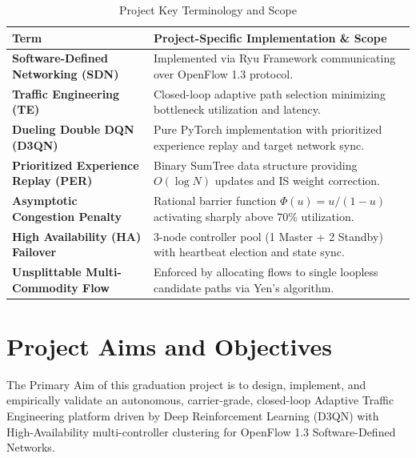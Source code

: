 \documentclass[12pt,a4paper,oneside]{report}
\begin{document}
\begin{table}[htbp]
\centering
\caption{Project Key Terminology and Scope}
\label{tab:terminology}
\small
\begin{tabularx}{\textwidth}{l X}
\toprule
\textbf{Term} & \textbf{Project-Specific Implementation \& Scope} \\
\midrule
\textbf{Software-Defined Networking (SDN)} & Implemented via Ryu Framework communicating over OpenFlow 1.3 protocol. \\
\textbf{Traffic Engineering (TE)} & Closed-loop adaptive path selection minimizing bottleneck utilization and latency. \\
\textbf{Dueling Double DQN (D3QN)} & Pure PyTorch implementation with prioritized experience replay and target network sync. \\
\textbf{Prioritized Experience Replay (PER)} & Binary SumTree data structure providing $O(\log N)$ updates and IS weight correction. \\
\textbf{Asymptotic Congestion Penalty} & Rational barrier function $\Phi(u) = u / (1 - u)$ activating sharply above 70\% utilization. \\
\textbf{High Availability (HA) Failover} & 3-node controller pool (1 Master + 2 Standby) with heartbeat election and state sync. \\
\textbf{Unsplittable Multi-Commodity Flow} & Enforced by allocating flows to single loopless candidate paths via Yen's algorithm. \\
\bottomrule
\end{tabularx}
\end{table}

\section{Project Aims and Objectives}
The Primary Aim of this graduation project is to design, implement, and empirically validate an autonomous, carrier-grade, closed-loop Adaptive Traffic Engineering platform driven by Deep Reinforcement Learning (D3QN) with High-Availability multi-controller clustering for OpenFlow 1.3 Software-Defined Networks.
\end{document}
